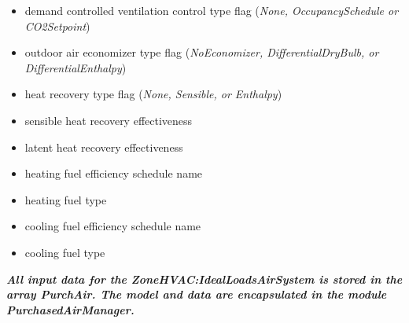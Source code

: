\begin{itemize}
  \item demand controlled ventilation control type flag (\emph{None, OccupancySchedule or CO2Setpoint})
  \item outdoor air economizer type flag (\emph{NoEconomizer, DifferentialDryBulb, or DifferentialEnthalpy})
  \item heat recovery type flag (\emph{None, Sensible, or Enthalpy})
  \item sensible heat recovery effectiveness
  \item latent heat recovery effectiveness
  \item heating fuel efficiency schedule name
  \item heating fuel type
  \item cooling fuel efficiency schedule name
  \item cooling fuel type
\end{itemize}

\emph{\textbf{All input data for the ZoneHVAC:IdealLoadsAirSystem is stored in the array PurchAir. The model and data are encapsulated in the module PurchasedAirManager.}}

